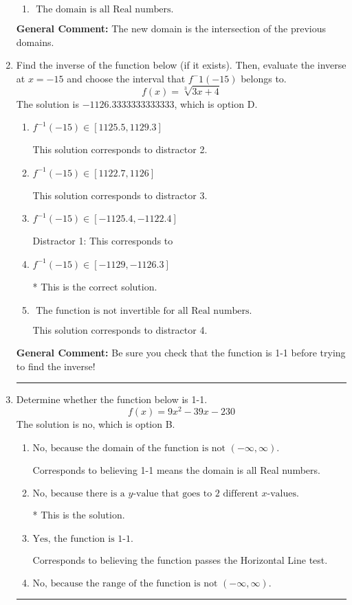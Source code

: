 \documentclass{extbook}[14pt]
\newcommand{\litem}[1]{\item #1

\rule{\textwidth}{0.4pt}}
\begin{document}
\begin{enumerate}
{\begin{enumerate}[label=\Alph*.]
\item \( \text{ The domain is all Real numbers. } \)


\end{enumerate}

\textbf{General Comment:} The new domain is the intersection of the previous domains.
}
\litem{
Find the inverse of the function below (if it exists). Then, evaluate the inverse at $x = -15$ and choose the interval that $f^-1(-15)$ belongs to.
\[ f(x) = \sqrt[3]{3 x + 4} \]The solution is \( -1126.3333333333333 \), which is option D.\begin{enumerate}[label=\Alph*.]
\item \( f^{-1}(-15) \in [1125.5, 1129.3] \)

 This solution corresponds to distractor 2.
\item \( f^{-1}(-15) \in [1122.7, 1126] \)

 This solution corresponds to distractor 3.
\item \( f^{-1}(-15) \in [-1125.4, -1122.4] \)

 Distractor 1: This corresponds to 
\item \( f^{-1}(-15) \in [-1129, -1126.3] \)

* This is the correct solution.
\item \( \text{ The function is not invertible for all Real numbers. } \)

 This solution corresponds to distractor 4.
\end{enumerate}

\textbf{General Comment:} Be sure you check that the function is 1-1 before trying to find the inverse!
}
\litem{
Determine whether the function below is 1-1.
\[ f(x) = 9 x^2 - 39 x - 230 \]The solution is \( \text{no} \), which is option B.\begin{enumerate}[label=\Alph*.]
\item \( \text{No, because the domain of the function is not $(-\infty, \infty)$.} \)

Corresponds to believing 1-1 means the domain is all Real numbers.
\item \( \text{No, because there is a $y$-value that goes to 2 different $x$-values.} \)

* This is the solution.
\item \( \text{Yes, the function is 1-1.} \)

Corresponds to believing the function passes the Horizontal Line test.
\item \( \text{No, because the range of the function is not $(-\infty, \infty)$.} \)


\end{enumerate}}
\end{enumerate}
\end{document}
